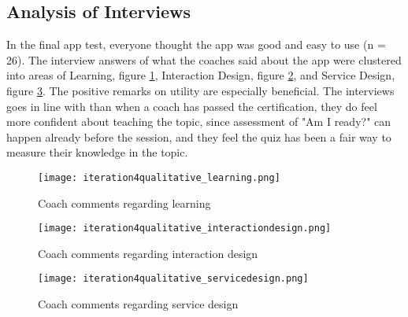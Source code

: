 \subsection{Analysis of Interviews}

In the final app test, everyone thought the app was good and easy to use (n = 26). The interview answers of what the coaches said about the app were clustered into areas of Learning, figure \ref{fig:learning}, Interaction Design, figure \ref{fig:interactiondesign}, and Service Design, figure \ref{fig:servicedesign}. The positive remarks on utility are especially beneficial. The interviews goes in line with than when a coach has passed the certification, they do feel more confident about teaching the topic, since assessment of "Am I ready?" can happen already before the session, and they feel the quiz has been a fair way to measure their knowledge in the topic.

\begin{figure}[h]
    \centering
    \texttt{[image: iteration4qualitative\_learning.png]}
    \caption{Coach comments regarding learning}
    \label{fig:learning}
\end{figure}

\begin{figure}[h]
    \centering
    \texttt{[image: iteration4qualitative\_interactiondesign.png]}
    \caption{Coach comments regarding interaction design}
    \label{fig:interactiondesign}
\end{figure}

\begin{figure}[h]
    \centering
    \texttt{[image: iteration4qualitative\_servicedesign.png]}
    \caption{Coach comments regarding service design}
    \label{fig:servicedesign}
\end{figure}

\clearpage
